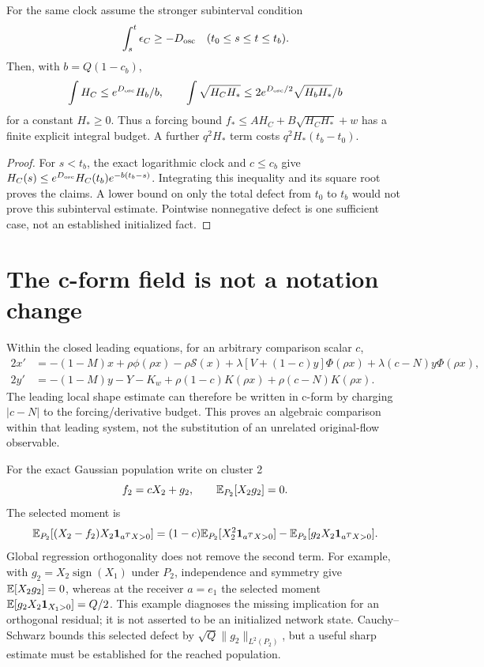 \documentclass[11pt]{article}
\numberwithin{equation}{section}
\theoremstyle{remark}\newtheorem{remark}[theorem]{Remark}
\begin{document}
\begin{proposition}\label{inc:AN03:clock:v1:forcing}
For the same clock assume the stronger subinterval condition
\[
 \int_s^t\epsilon_C\ge-D_{\rm osc}\quad(t_0\le s\le t\le t_b).
\]
Then, with $b=Q(1-c_b)$,
\[
 \int H_C\le e^{D_{\rm osc}}H_b/b,\qquad
 \int\sqrt{H_CH_*}\le2e^{D_{\rm osc}/2}\sqrt{H_bH_*}/b
\]
for a constant $H_*\ge0$. Thus a forcing bound
$f_*\le A H_C+B\sqrt{H_CH_*}+w$ has a finite explicit integral budget. A further $q^2H_*$ term costs $q^2H_*(t_b-t_0)$.
\end{proposition}
\begin{proof}
For $s<t_b$, the exact logarithmic clock and $c\le c_b$ give
$H_C(s)\le e^{D_{\rm osc}}H_C(t_b)e^{-b(t_b-s)}$. Integrating this inequality and its square root proves the claims. A lower bound on only the total defect from $t_0$ to $t_b$ would not prove this subinterval estimate. Pointwise nonnegative defect is one sufficient case, not an established initialized fact.
\end{proof}

\section{The c-form field is not a notation change}
Within the closed leading equations, for an arbitrary comparison scalar $c$,
\begin{align*}
 2x'&=-(1-M)x+\rho\phi(\rho x)-\rho\mathcal S(x)
       +\lambda[V+(1-c)y]\Phi(\rho x)
       +\lambda(c-N)y\Phi(\rho x),\\
 2y'&=-(1-M)y-Y-K_w+\rho(1-c)K(\rho x)
       +\rho(c-N)K(\rho x).
\end{align*}
The leading local shape estimate can therefore be written in c-form by charging $|c-N|$ to the forcing/derivative budget. This proves an algebraic comparison within that leading system, not the substitution of an unrelated original-flow observable.

For the exact Gaussian population write on cluster 2
\[
 f_2=cX_2+g_2,\qquad \mathbb E_{P_2}[X_2g_2]=0.
\]
The selected moment is
\[
 \mathbb E_{P_2}[(X_2-f_2)X_2\mathbf1_{a^TX>0}]
 =(1-c)\mathbb E_{P_2}[X_2^2\mathbf1_{a^TX>0}]
 -\mathbb E_{P_2}[g_2X_2\mathbf1_{a^TX>0}].
\]
Global regression orthogonality does not remove the second term. For example, with $g_2=X_2\operatorname{sign}(X_1)$ under $P_2$, independence and symmetry give $\mathbb E[X_2g_2]=0$, whereas at the receiver $a=e_1$ the selected moment $\mathbb E[g_2X_2\mathbf1_{X_1>0}]=Q/2$. This example diagnoses the missing implication for an orthogonal residual; it is not asserted to be an initialized network state. Cauchy--Schwarz bounds this selected defect by $\sqrt Q\|g_2\|_{L^2(P_2)}$, but a useful sharp estimate must be established for the reached population.
\end{document}
